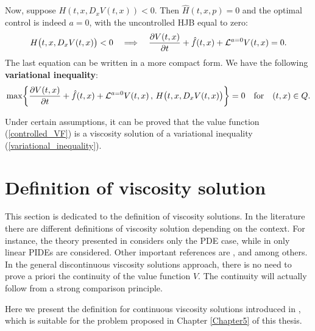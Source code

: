 Now, suppose $H(t,x,D_x V(t,x)) < 0$. Then $\hat H(t,x,p)=0$ and the optimal control is indeed $a=0$, with the uncontrolled HJB equal to zero:
\begin{equation}
 H\bigl( t,x, D_x V(t,x) \bigr) < 0 \quad \Longrightarrow \quad  \frac{\partial V(t,x)}{\partial t} + \hat f(t,x) + \mathcal{L}^{a=0}V(t,x) = 0.
\end{equation}
The last equation can be written in a more compact form. We have the following \textbf{variational inequality}:
\begin{equation}\label{variational_inequality}
 \max \biggl\{ \frac{\partial V(t,x)}{\partial t} + \hat f(t,x) + \mathcal{L}^{a=0}V(t,x) \,,\, H\bigl( t,x, D_x V(t,x) \bigr) \biggr \} =0 \quad \mbox{for} \quad (t,x)\in Q. 
\end{equation}


Under certain assumptions, it can be proved that the value function (\ref{controlled_VF}) is a viscosity solution of a variational inequality 
(\ref{variational_inequality}).




\section{Definition of viscosity solution}\label{viscosity_solution_section}

This section is dedicated to the definition of viscosity solutions.
In the literature there are different definitions of viscosity solution depending on the context. 
For instance, the theory presented in \cite{Pham} considers only the PDE case, while in \cite{Cont}
only linear PIDEs are considered. 
Other important references are \cite{FlemingSoner}, \cite{Ph98} and \cite{BaIm08} among others.
In the general discontinuous viscosity solutions approach, there is no
need to prove a priori the continuity of the value function $V$. The continuity will actually follow from
a strong comparison principle. 

\noindent
Here we present the definition for continuous viscosity solutions introduced in \cite{Kab16}, which is suitable for the problem proposed in Chapter \ref{Chapter5} of this thesis.
\newline




